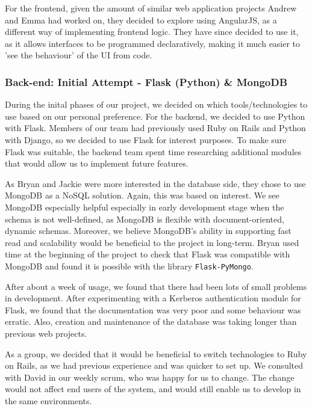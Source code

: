 \documentclass[a4paper, titlepage]{article}
\begin{document}
For the frontend, given the amount of similar web application projects Andrew and Emma had worked on, they decided to explore using AngularJS, as a different way of implementing frontend logic. They have since decided to use it, as it allows interfaces to be programmed declaratively, making it much easier to 'see the behaviour' of the UI from code.


\subsubsection{Back-end: Initial Attempt - Flask (Python) \& MongoDB}

During the inital phases of our project, we decided on which tools/technologies to use based on our personal preference. For the backend, we decided to use Python with Flask. Members of our team had previously used Ruby on Rails and Python with Django, so we decided to use Flask for interest purposes. To make sure Flask was suitable, the backend team spent time researching additional modules that would allow us to implement future features.


As Bryan and Jackie were more interested in the database side, they chose to use MongoDB as a NoSQL
solution. Again, this was based on interest. We see MongoDB especially helpful especially in early
development stage when the schema is not well-defined, as MongoDB is flexible with document-oriented,
dynamic schemas. Moreover, we believe MongoDB's ability in supporting fast read and scalability would be
beneficial to the project in long-term. Bryan used time at the beginning of the project to check that 
Flask was compatible with MongoDB and found it is possible with the library \texttt{Flask-PyMongo}.

After about a week of usage, we found that there had been lots of small problems in development. After 
experimenting with a Kerberos authentication module for Flask, we found that the documentation was 
very poor and some behaviour was erratic. Also, creation and maintenance of the database was taking 
longer than previous web projects. 

As a group, we decided that it would be beneficial to switch technologies to Ruby on Rails, as we had
previous experience and was quicker to set up. We consulted with David in our weekly scrum, who was
happy for us to change. The change would not affect end users of the system, and would still enable us 
to develop in the same environments. 
\end{document}
